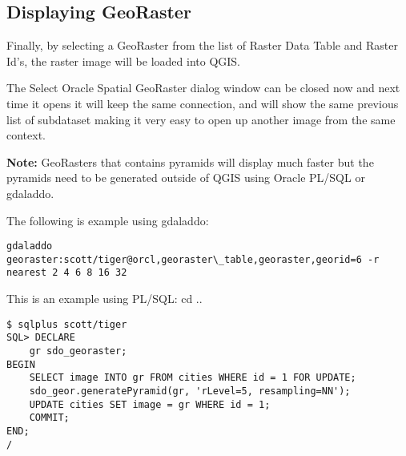 \subsection{Displaying GeoRaster}

Finally, by selecting a GeoRaster from the list of Raster Data Table and Raster Id's, the raster image will be 
loaded into QGIS.

The Select Oracle Spatial GeoRaster dialog window can be closed now and next time it opens it will keep the same 
connection, and will show the same previous list of subdataset making it very easy to open up another image 
from the same context.

\textbf{Note:} GeoRasters that contains pyramids will display much faster but the pyramids need to be generated 
outside of QGIS using Oracle PL/SQL or gdaladdo.

The following is example using gdaladdo:

\begin{verbatim}
gdaladdo georaster:scott/tiger@orcl,georaster\_table,georaster,georid=6 -r 
nearest 2 4 6 8 16 32
\end{verbatim}

This is an example using PL/SQL: 
cd ..
\begin{verbatim}
$ sqlplus scott/tiger
SQL> DECLARE
    gr sdo_georaster;
BEGIN
    SELECT image INTO gr FROM cities WHERE id = 1 FOR UPDATE;
    sdo_geor.generatePyramid(gr, 'rLevel=5, resampling=NN');
    UPDATE cities SET image = gr WHERE id = 1;
    COMMIT;
END;
/
\end{verbatim}
